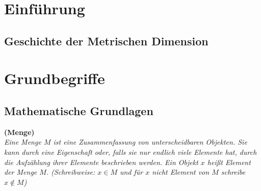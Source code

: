 


\listoftodos


\section{Einführung}
\subsection{Geschichte der Metrischen Dimension}
\pagebreak
\section{Grundbegriffe}

\subsection{Mathematische Grundlagen}
\begin{defi}{\textbf{(Menge)}}\\
\emph{Eine Menge $M$ ist eine Zusammenfassung von unterscheidbaren
Objekten. Sie kann durch eine Eigenschaft oder, falls sie nur endlich viele Elemente hat, durch die Aufzählung ihrer Elemente beschrieben werden. Ein Objekt $x$ heißt Element der Menge $M$. (Schreibweise: $x \in M$ und für $x$ nicht
Element von $M$ schreibe $x \notin M$)}
\end{defi}

